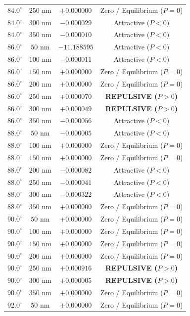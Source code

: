 \documentclass[12pt,letterpaper]{article}
\begin{document}
\begin{table}[h!]
\begin{tabular}{cccc}
$84.0^\circ$ & $250$ nm & $+0.000000$ & Zero / Equilibrium ($P=0$) \\
$84.0^\circ$ & $300$ nm & $-0.000029$ & Attractive ($P<0$) \\
$84.0^\circ$ & $350$ nm & $-0.000010$ & Attractive ($P<0$) \\
$86.0^\circ$ & $50$ nm & $-11.188595$ & Attractive ($P<0$) \\
$86.0^\circ$ & $100$ nm & $-0.000011$ & Attractive ($P<0$) \\
$86.0^\circ$ & $150$ nm & $+0.000000$ & Zero / Equilibrium ($P=0$) \\
$86.0^\circ$ & $200$ nm & $+0.000000$ & Zero / Equilibrium ($P=0$) \\
$86.0^\circ$ & $250$ nm & $+0.000070$ & \textbf{REPULSIVE ($P>0$)} \\
$86.0^\circ$ & $300$ nm & $+0.000049$ & \textbf{REPULSIVE ($P>0$)} \\
$86.0^\circ$ & $350$ nm & $-0.000056$ & Attractive ($P<0$) \\
$88.0^\circ$ & $50$ nm & $-0.000005$ & Attractive ($P<0$) \\
$88.0^\circ$ & $100$ nm & $+0.000000$ & Zero / Equilibrium ($P=0$) \\
$88.0^\circ$ & $150$ nm & $+0.000000$ & Zero / Equilibrium ($P=0$) \\
$88.0^\circ$ & $200$ nm & $-0.000082$ & Attractive ($P<0$) \\
$88.0^\circ$ & $250$ nm & $-0.000041$ & Attractive ($P<0$) \\
$88.0^\circ$ & $300$ nm & $-0.000322$ & Attractive ($P<0$) \\
$88.0^\circ$ & $350$ nm & $+0.000000$ & Zero / Equilibrium ($P=0$) \\
$90.0^\circ$ & $50$ nm & $+0.000000$ & Zero / Equilibrium ($P=0$) \\
$90.0^\circ$ & $100$ nm & $+0.000000$ & Zero / Equilibrium ($P=0$) \\
$90.0^\circ$ & $150$ nm & $+0.000000$ & Zero / Equilibrium ($P=0$) \\
$90.0^\circ$ & $200$ nm & $+0.000000$ & Zero / Equilibrium ($P=0$) \\
$90.0^\circ$ & $250$ nm & $+0.000916$ & \textbf{REPULSIVE ($P>0$)} \\
$90.0^\circ$ & $300$ nm & $+0.000005$ & \textbf{REPULSIVE ($P>0$)} \\
$90.0^\circ$ & $350$ nm & $+0.000000$ & Zero / Equilibrium ($P=0$) \\
$92.0^\circ$ & $50$ nm & $+0.000000$ & Zero / Equilibrium ($P=0$) \\

\end{tabular}
\end{table}
\end{document}
